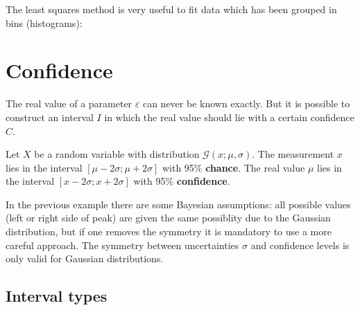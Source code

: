{	The least squares method is very useful to fit data which has been grouped in bins (histograms):
    
\section{Confidence}

	The real value of a parameter $\varepsilon$ can never be known exactly. But it is possible to construct an interval $I$ in which the real value should lie with a certain confidence $C$.
	\begin{example}
		Let $X$ be a random variable with distribution $\mathcal{G}(x;\mu, \sigma)$. The measurement $x$ lies in the interval $[\mu - 2\sigma;\mu+2\sigma]$ with 95\% \textbf{chance}. The real value $\mu$ lies in the interval $[x - 2\sigma;x+2\sigma]$ with 95\% \textbf{confidence}.
	\end{example}
	\begin{remark*}
		In the previous example there are some Bayesian assumptions: all possible values (left or right side of peak) are given the same possiblity due to the Gaussian distribution, but if one removes the symmetry it is mandatory to use a more careful approach. The symmetry between uncertainties $\sigma$ and confidence levels is only valid for Gaussian distributions.
	\end{remark*}
    
\subsection{Interval types}

}
